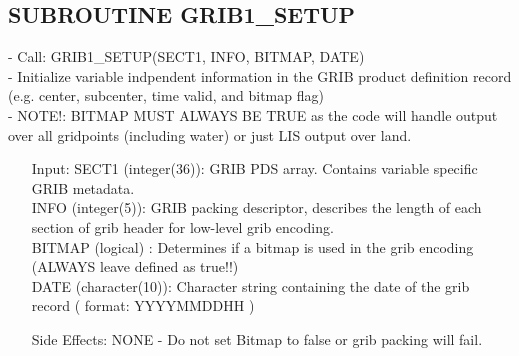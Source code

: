 \subsection{ SUBROUTINE GRIB1\_SETUP }
- Call: GRIB1\_SETUP(SECT1, INFO, BITMAP, DATE)   \\
- Initialize variable indpendent information in the GRIB product definition
  record (e.g. center, subcenter, time valid, and bitmap flag)  \\
- NOTE!: BITMAP MUST ALWAYS BE TRUE as the code will handle output over all
  gridpoints (including water) or just LIS output over land.\\
\begin{itemize}
 \item[Input: ]
  SECT1 (integer(36)): GRIB PDS array.  Contains variable specific GRIB metadata. \\
  INFO (integer(5)): GRIB packing descriptor, describes the length of each
     section of grib header for low-level grib encoding. \\
  BITMAP (logical) : Determines if a bitmap is used in the grib encoding
     (ALWAYS leave defined as true!!) \\
  DATE (character(10)): Character string containing the date of the grib
     record ( format: YYYYMMDDHH )  \\
 \item[Side Effects:]
  NONE - Do not set Bitmap to false or grib packing will fail.
\end{itemize}

